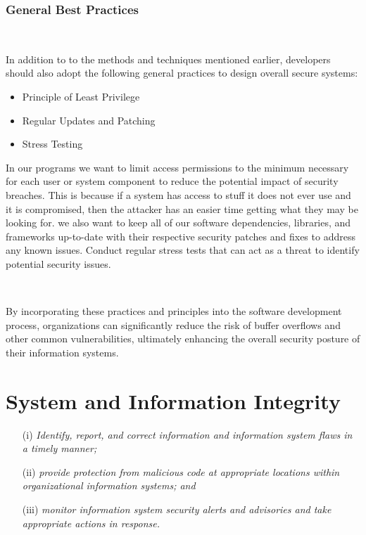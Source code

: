 \documentclass[12pt,a4paper]{report}
\begin{document}
\subsection{General Best Practices}
\

In addition to to the methods and techniques mentioned earlier, developers should also adopt the following general practices to design overall secure systems:

\begin{itemize}
 \item Principle of Least Privilege
 \item Regular Updates and Patching
 \item Stress Testing
\end{itemize}

In our programs we want to limit access permissions to the minimum necessary for each user or system component to reduce the potential impact of security breaches.
This is because if a system has access to stuff it does not ever use and it is compromised, then the attacker has an easier time getting what they may be looking for.
we also want to keep all of our software dependencies, libraries, and frameworks up-to-date with their respective security patches and fixes to address any known issues.
Conduct regular stress tests that can act as a threat to identify potential security issues.

\

By incorporating these practices and principles into the software development process, organizations can significantly reduce the risk of buffer overflows and other common vulnerabilities, ultimately enhancing the overall security posture of their information systems.

\chapter{System and Information Integrity}
\begin{enumerate}
 \item[(i)] \textit{Identify, report, and correct information and information system flaws in a timely manner;}
 \item[(ii)] \textit{provide protection from malicious code at appropriate locations within organizational information systems; and}
 \item[(iii)] \textit{monitor information system security alerts and advisories and take appropriate actions in response.}
\end{enumerate}
\end{document}
